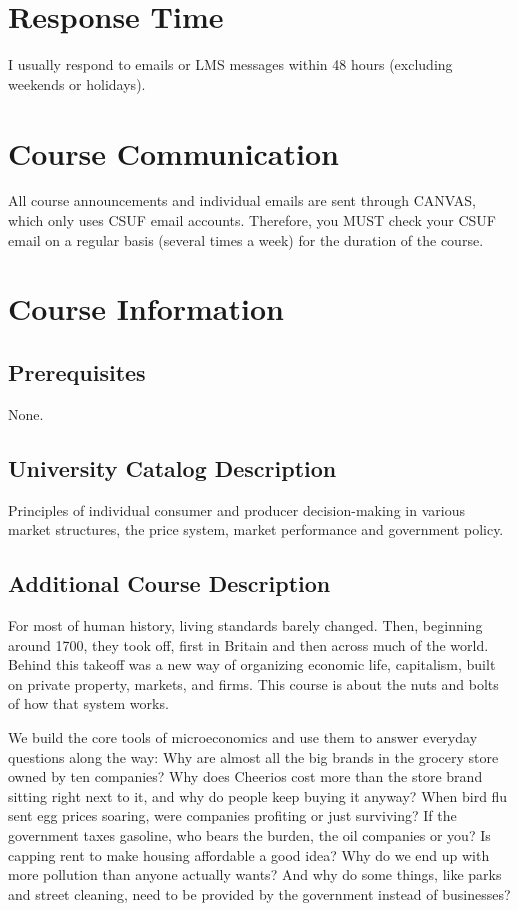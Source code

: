 \documentclass{syllabus}
\begin{document}
\section*{Response Time}
I usually respond to emails or LMS messages within 48 hours (excluding weekends or holidays).

\section*{Course Communication}
All course announcements and individual emails are sent through CANVAS, which only uses CSUF email accounts. Therefore, you MUST check your CSUF email on a regular basis (several times a week) for the duration of the course.

\section*{Course Information}

\subsection*{Prerequisites}
None.

\subsection*{University Catalog Description}

Principles of individual consumer and producer decision-making in various market structures, the price system, market performance and government policy.

\subsection*{Additional Course Description}

For most of human history, living standards barely changed. Then, beginning around 1700, they took off, first in Britain and then across much of the world. Behind this takeoff was a new way of organizing economic life, capitalism, built on private property, markets, and firms. This course is about the nuts and bolts of how that system works.

We build the core tools of microeconomics and use them to answer everyday questions along the way: Why are almost all the big brands in the grocery store owned by ten companies? Why does Cheerios cost more than the store brand sitting right next to it, and why do people keep buying it anyway? When bird flu sent egg prices soaring, were companies profiting or just surviving? If the government taxes gasoline, who bears the burden, the oil companies or you? Is capping rent to make housing affordable a good idea? Why do we end up with more pollution than anyone actually wants? And why do some things, like parks and street cleaning, need to be provided by the government instead of businesses?
\end{document}

